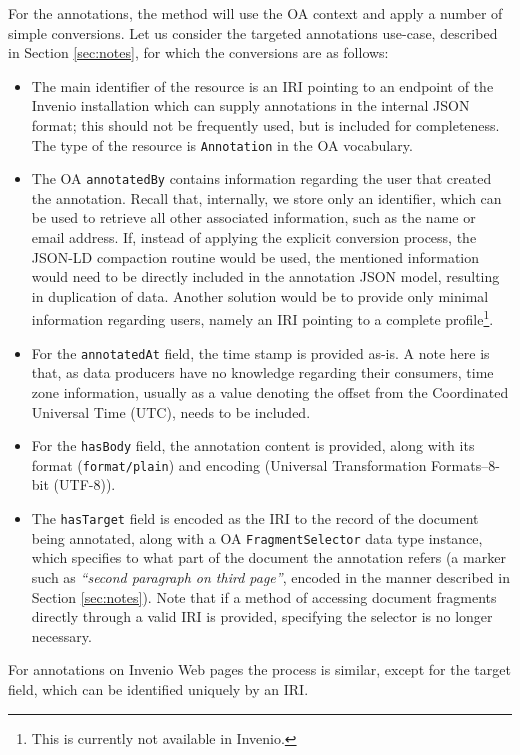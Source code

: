 For the annotations, the method will use the OA context and apply a number of
simple conversions. Let us consider the targeted annotations use-case,
described in Section \ref{sec:notes}, for which the conversions are as follows:
\begin{itemize}
  \item The main identifier of the resource is an IRI pointing to an endpoint of
        the Invenio installation which can supply annotations in the internal
        JSON format; this should not be frequently used, but is included for
        completeness. The type of the resource is \texttt{Annotation} in the
        OA vocabulary.
  \item The OA \texttt{annotatedBy} contains information regarding
        the user that created the annotation. Recall that, internally, we store
        only an identifier, which can be used to retrieve all other associated
        information, such as the name or email address. If, instead of applying
        the explicit conversion process, the JSON-LD compaction routine would be
        used, the mentioned information would need to be directly included in
        the annotation JSON model, resulting in duplication of data. Another
        solution would be to provide only minimal information regarding users,
        namely an IRI pointing to a complete profile\footnote{This is currently
        not available in Invenio.}.
  \item For the \texttt{annotatedAt} field, the time stamp is provided as-is. A
        note here is that, as data producers have no knowledge regarding their
        consumers, time zone information, usually as a value denoting the offset
        from the Coordinated Universal Time (UTC), needs to be included.
  \item For the \texttt{hasBody} field, the annotation content is provided, along
        with its format (\texttt{format/plain}) and encoding (Universal
        Transformation Formats--8-bit (UTF-8)).
  \item The \texttt{hasTarget} field is encoded as the IRI to the record of the
        document being annotated, along with a OA \texttt{FragmentSelector}
        data type instance, which specifies to what part of the document the
        annotation refers (a marker such as \textit{``second paragraph on
        third page''}, encoded in the manner described in
        Section \ref{sec:notes}). Note that if a method of accessing document
        fragments directly through a valid IRI is provided, specifying the
        selector is no longer necessary.
\end{itemize}
For annotations on Invenio Web pages the process is similar, except for the
target field, which can be identified uniquely by an IRI.

